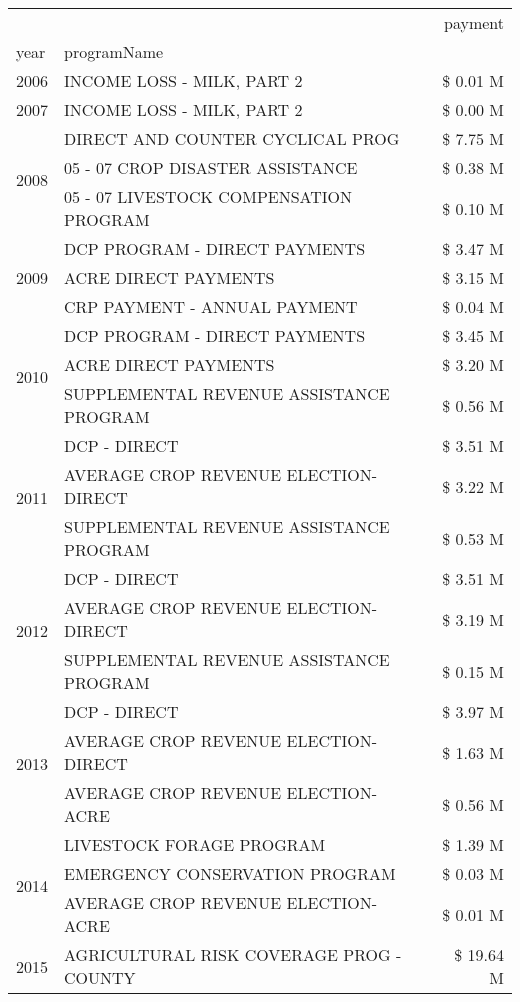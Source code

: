 \begin{tabular}{llr}
\toprule
 &  & payment \\
year & programName &  \\
\midrule
2006 & INCOME LOSS - MILK, PART 2 & \$ 0.01 M \\
\cline{1-3}
2007 & INCOME LOSS - MILK, PART 2 & \$ 0.00 M \\
\cline{1-3}
\multirow[t]{3}{*}{2008} & DIRECT AND COUNTER CYCLICAL PROG & \$ 7.75 M \\
 & 05 - 07 CROP DISASTER ASSISTANCE & \$ 0.38 M \\
 & 05 - 07 LIVESTOCK COMPENSATION PROGRAM & \$ 0.10 M \\
\cline{1-3}
\multirow[t]{3}{*}{2009} & DCP PROGRAM - DIRECT PAYMENTS & \$ 3.47 M \\
 & ACRE DIRECT PAYMENTS & \$ 3.15 M \\
 & CRP PAYMENT - ANNUAL PAYMENT & \$ 0.04 M \\
\cline{1-3}
\multirow[t]{3}{*}{2010} & DCP PROGRAM - DIRECT PAYMENTS & \$ 3.45 M \\
 & ACRE DIRECT PAYMENTS & \$ 3.20 M \\
 & SUPPLEMENTAL REVENUE ASSISTANCE PROGRAM & \$ 0.56 M \\
\cline{1-3}
\multirow[t]{3}{*}{2011} & DCP - DIRECT & \$ 3.51 M \\
 & AVERAGE CROP REVENUE ELECTION-DIRECT & \$ 3.22 M \\
 & SUPPLEMENTAL REVENUE ASSISTANCE PROGRAM & \$ 0.53 M \\
\cline{1-3}
\multirow[t]{3}{*}{2012} & DCP - DIRECT & \$ 3.51 M \\
 & AVERAGE CROP REVENUE ELECTION-DIRECT & \$ 3.19 M \\
 & SUPPLEMENTAL REVENUE ASSISTANCE PROGRAM & \$ 0.15 M \\
\cline{1-3}
\multirow[t]{3}{*}{2013} & DCP - DIRECT & \$ 3.97 M \\
 & AVERAGE CROP REVENUE ELECTION-DIRECT & \$ 1.63 M \\
 & AVERAGE CROP REVENUE ELECTION-ACRE & \$ 0.56 M \\
\cline{1-3}
\multirow[t]{3}{*}{2014} & LIVESTOCK FORAGE PROGRAM & \$ 1.39 M \\
 & EMERGENCY CONSERVATION PROGRAM & \$ 0.03 M \\
 & AVERAGE CROP REVENUE ELECTION-ACRE & \$ 0.01 M \\
\cline{1-3}
\multirow[t]{3}{*}{2015} & AGRICULTURAL RISK COVERAGE PROG - COUNTY & \$ 19.64 M \\

\end{tabular}
